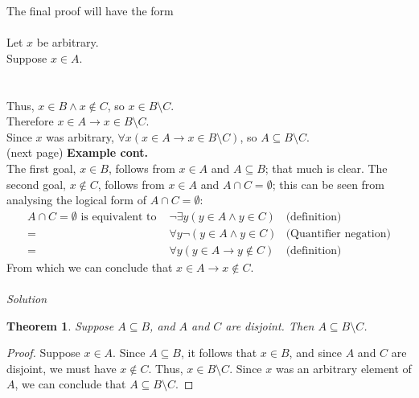\documentclass{report}
\newtheorem*{theorem}{Theorem}
\theoremstyle{definition}
\begin{document}
The final proof will have the form\\
\vspace{1mm}\\
\indent Let $x$ be arbitrary.\\
\indent\indent Suppose $x\in A$.\\
\indent\indent{}\\
\indent\indent{}\\
\indent\indent\indent Thus, $x\in B\land x\notin C$, so $x\in B\setminus C$.\\
\indent\indent Therefore $x\in A\to x\in B\setminus C$.\\
\indent Since $x$ was arbitrary, $\forall x(x\in A\to x\in B\setminus C)$, so $A\subseteq B\setminus C$.\\
(next page)\newpage
\noindent\textbf{Example cont.}\\
The first goal, $x\in B$, follows from $x\in A$ and $A\subseteq B$; that much is clear. The second goal, $x\notin C$, follows from $x\in A$ and $A\cap C=\emptyset$; this can be seen
from analysing the logical form of $A\cap C=\emptyset$:
\begin{align*}
A\cap C=\emptyset\text{ is equivalent to }&\neg\exists y(y\in A\land y\in C)&\text{(definition)}\\
=&\forall y\neg(y\in A\land y\in C)&\text{(Quantifier negation)}\\
=&\forall y(y\in A\to y\notin C)&\text{(definition)}
\end{align*}
From which we can conclude that $x\in A\to x\notin C$.\\
\vspace{1mm}\\
\textit{Solution}
\begin{theorem}
Suppose $A\subseteq B$, and $A$ and $C$ are disjoint. Then $A\subseteq B\setminus C$.
\end{theorem}
\begin{proof}
Suppose $x\in A$. Since $A\subseteq B$, it follows that $x\in B$, and since $A$ and $C$ are disjoint, we must have $x\notin C$. Thus, $x\in B\setminus C$. Since $x$ was an arbitrary
element of $A$, we can conclude that $A\subseteq B\setminus C$.
\end{proof}
\newpage
\end{document}
